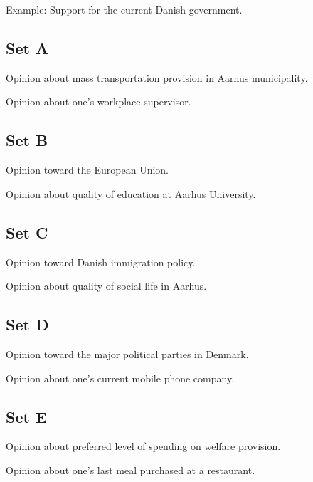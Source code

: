 \documentclass[a4, 12pt]{article}
\begin{document}
\begin{enumerate*}
	
\item Example: Support for the current Danish government.

\subsection*{Set A}

\item Opinion about mass transportation provision in Aarhus municipality.

\item Opinion about one's workplace supervisor.

\subsection*{Set B}

\item Opinion toward the European Union.

\item Opinion about quality of education at Aarhus University.

\subsection*{Set C}

\item Opinion toward Danish immigration policy.

\item Opinion about quality of social life in Aarhus.

\subsection*{Set D}

\item Opinion toward the major political parties in Denmark.

\item Opinion about one's current mobile phone company.

\subsection*{Set E}

\item Opinion about preferred level of spending on welfare provision.

\item Opinion about one's last meal purchased at a restaurant.
	
\end{enumerate*}
\end{document}
